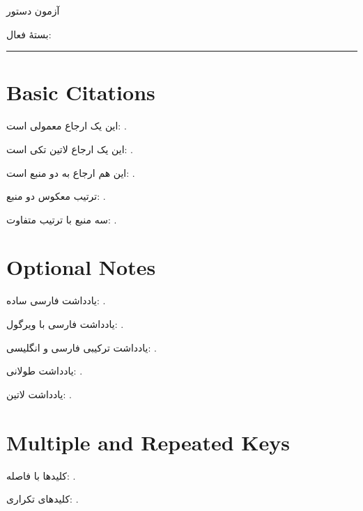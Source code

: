 \documentclass{article}
\newcommand{\ActivePackageName}{XePersian}
\newcommand{\ActivePackageName}{UniPersian}
\begin{document}
    \begin{center}
        {\Large آزمون دستور }

        \medskip
        بستهٔ فعال: \lr{\ActivePackageName}
    \end{center}

    \hrule
    \bigskip

    \tableofcontents

    \listoffigures

    \section{Basic Citations}

    این یک ارجاع معمولی است:
    \cite{knuth}.

    این یک ارجاع لاتین تکی است:
    .

    این هم ارجاع به دو منبع است:
    .

    ترتیب معکوس دو منبع:
    .

    سه منبع با ترتیب متفاوت:
    .

    \section{Optional Notes}

    یادداشت فارسی ساده:
    .

    یادداشت فارسی با ویرگول:
    .

    یادداشت ترکیبی فارسی و انگلیسی:
    .

    یادداشت طولانی:
    .

    یادداشت لاتین:
    .

    \section{Multiple and Repeated Keys}

    کلیدها با فاصله:
    .

    کلیدهای تکراری:
    .
\end{document}

